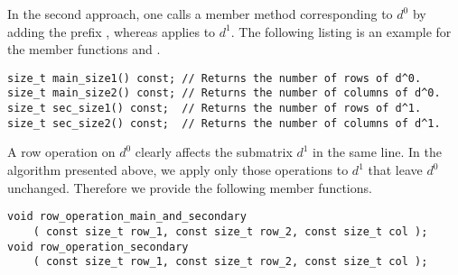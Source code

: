 In the second approach, one calls a member method corresponding to $d^0$ by adding the prefix , whereas  applies to $d^1$.
The following listing is an example for the member functions  and .
\begin{lstlisting}
size_t main_size1() const; // Returns the number of rows of d^0.
size_t main_size2() const; // Returns the number of columns of d^0.
size_t sec_size1() const;  // Returns the number of rows of d^1.
size_t sec_size2() const;  // Returns the number of columns of d^1.
\end{lstlisting}


A row operation on $d^0$ clearly affects the submatrix $d^1$ in the same line.
In the algorithm presented above, we apply only those operations to $d^1$ that leave $d^0$ unchanged.
Therefore we provide the following member functions.
\begin{lstlisting}
void row_operation_main_and_secondary
    ( const size_t row_1, const size_t row_2, const size_t col );
void row_operation_secondary
    ( const size_t row_1, const size_t row_2, const size_t col );
\end{lstlisting}





